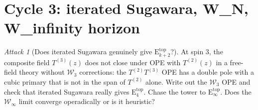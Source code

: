 \documentclass{article}
\theoremstyle{definition}
\theoremstyle{remark}
\newtheorem{attack}[theorem]{Attack}
\newcommand{\Etop}[1]{\mathrm{E}_{#1}^{\mathrm{top}}}
\newcommand{\cW}{\mathcal{W}}
\begin{document}
\section{Cycle 3: iterated Sugawara, W_N, W_infinity horizon}
\label{sec:cycle-3}

\begin{attack}[Does iterated Sugawara genuinely give $\Etop{k+2}$?]
At spin $3$, the composite field $T^{(3)}(z)$ does not close under
OPE with $T^{(2)}(z)$ in a free-field theory without $\cW_3$
corrections: the $T^{(2)} T^{(3)}$ OPE has a double pole with a
cubic primary that is not in the span of $T^{(2)}$ alone. Write out
the $\cW_3$ OPE and check that iterated Sugawara really gives
$\Etop{4}$. Chase the tower to $\Etop{\infty}$. Does the
$\cW_\infty$ limit converge operadically or is it heuristic?
\end{attack}
\end{document}
